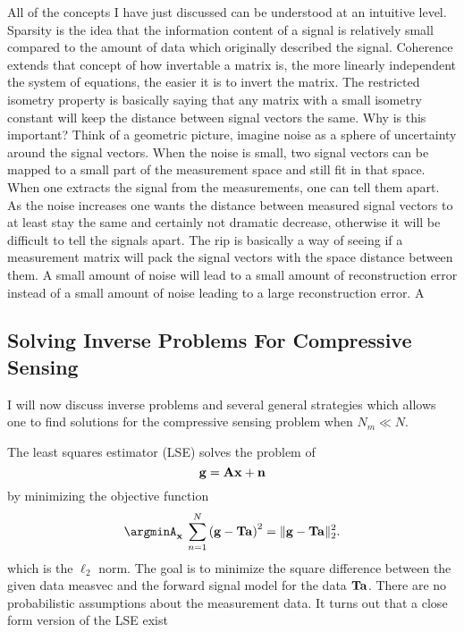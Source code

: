 All of the concepts I have just discussed can be understood at an intuitive level. Sparsity is the idea that the information content of a signal is relatively small compared to the amount of data which originally described the signal. Coherence extends that concept of how invertable a matrix is, the more linearly independent the system of equations, the easier it is to invert the matrix. The restricted isometry property is basically saying that any matrix with a small isometry constant will keep the distance between signal vectors the same. Why is this important? Think of a geometric picture, imagine noise as a sphere of uncertainty around the signal vectors. When the noise is small, two signal vectors can be mapped to a small part of the measurement space and still fit in that space. When one extracts the signal from the measurements, one can tell them apart. As the noise increases one wants the distance between measured signal vectors to at least stay the same and certainly not dramatic decrease, otherwise it will be difficult to tell the signals apart. The \gls{rip} is basically a way of seeing if a measurement matrix will pack the signal vectors with the space distance between them. A small amount of noise will lead to a small amount of reconstruction error instead of a small amount of noise leading to a large reconstruction error. 
\gls{A}


\subsection{Solving Inverse Problems For Compressive Sensing}


I will now discuss inverse problems and several general strategies which allows one to find solutions for the compressive sensing problem when $N_m \ll N$. 

The least squares estimator (LSE) solves the problem of 
\begin{equation}
	\mathbf{g} = \mathbf{Ax} + \mathbf{n}
	\label{eq:gTan}
\end{equation}
by minimizing the objective function 
\begin{equation}
	\argminA_{\mb{x}} \: \sum_{n=1}^{N} \left( \mb{g} - \mb{Ta} \right)^2 = \| \mb{g} - \mb{Ta} \|_{2}^{2}.
\end{equation}
which is the $\ell_2$ norm. The goal is to minimize the square difference between the given data \gls{measvec} and the forward signal model for the data $\mathbf{Ta}$. There are no probabilistic assumptions about the measurement data. It turns out that a close form version of the LSE exist


